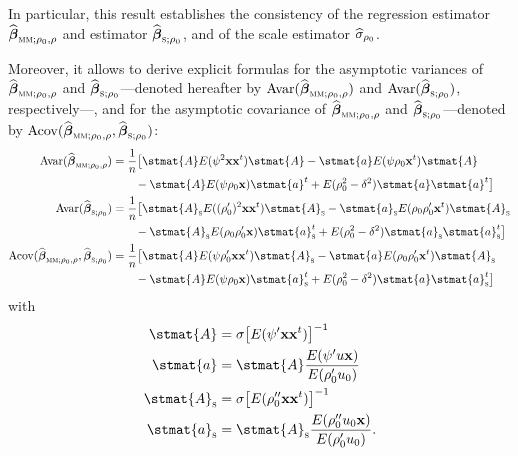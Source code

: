 In particular, this result establishes the consistency of the regression
 estimator $\sthat{\boldsymbol\beta}_{\stsc{MM};\rho_0,\rho}$ and
 estimator $\sthat{\boldsymbol\beta}_{\stsc{S};\rho_0}$, and of the
scale  estimator $\widehat{\sigma}_{\rho_0}$.

Moreover, it allows to derive explicit formulas for the asymptotic variances
of $\sthat{\boldsymbol\beta}_{\stsc{MM};\rho_0,\rho}$ and
$\sthat{\boldsymbol\beta}_{\stsc{S};\rho_0}$---denoted hereafter by
$\mathrm{Avar}(\sthat{\boldsymbol\beta}_{\stsc{MM};\rho_0,\rho})$ and 
$\mathrm{Avar}(\sthat{\boldsymbol\beta}_{\stsc{S};\rho_0})$, respectively---, and for the asymptotic
covariance of $\sthat{\boldsymbol\beta}_{\stsc{MM};\rho_0,\rho}$ and
$\sthat{\boldsymbol\beta}_{\stsc{S};\rho_0}$---denoted by
$\mathrm{Acov}(\sthat{\boldsymbol\beta}_{\stsc{MM};\rho_0,\rho},
\sthat{\boldsymbol\beta}_{\stsc{S};\rho_0})$:
%
\begin{align}
    \label{eq:Avar_betahat_MM}
    \mathrm{Avar}(\sthat{\boldsymbol\beta}_{\stsc{MM};\rho_0,\rho})
    & = \frac{1}{n} \big[ \stmat{A} E(\psi^2\stvec{x}\stvec{x}^t)\stmat{A} 
        - \stmat{a} E(\psi\rho_0\stvec{x}^t) \stmat{A}
    \\\nonumber & \qquad 
        - \stmat{A} E(\psi\rho_0\stvec{x}) \stmat{a}^t 
        + E(\rho_0^2 - \delta^2)  \stmat{a}\stmat{a}^t \big]
    \\
    \label{eq:Avar_betahat_S}
    \mathrm{Avar}(\sthat{\boldsymbol\beta}_{\stsc{S};\rho_0})
    & = \frac{1}{n} \big[ \stmat{A}_\stsc{S} E((\rho_0')^2 \stvec{x}\stvec{x}^t) \stmat{A}_\stsc{S} 
        - \stmat{a}_\stsc{S} E(\rho_0\rho_0'\stvec{x}^t) \stmat{A}_\stsc{S}
    \\\nonumber & \qquad 
        - \stmat{A}_\stsc{S} E(\rho_0\rho_0'\stvec{x}) \stmat{a}_\stsc{S}^t 
        + E(\rho_0^2 - \delta^2) \stmat{a}_\stsc{S}\stmat{a}_\stsc{S}^t \big]
    \\
    \label{eq:Acov_betahat_MM_S}
    \mathrm{Acov}(\sthat{\boldsymbol\beta}_{\stsc{MM};\rho_0,\rho},
        \sthat{\boldsymbol\beta}_{\stsc{S};\rho_0})
    & = \frac{1}{n} \big[ \stmat{A} E(\psi\rho_0'\stvec{x}\stvec{x}^t) \stmat{A}_\stsc{S}
        - \stmat{a} E(\rho_0\rho_0'\stvec{x}^t) \stmat{A}_\stsc{S}
    \\\nonumber & \qquad 
        - \stmat{A} E(\psi\rho_0\stvec{x}) \stmat{a}_\stsc{S}^t
        + E(\rho_0^2 - \delta^2) \stmat{a}\stmat{a}_\stsc{S}^t \big]
\end{align}
%
with
%
\begin{align}
    \label{eq:A}
    \stmat{A} &  = \sigma \left[ E(\psi'\stvec{x}\stvec{x}^t)\right]^{-1}
    \\
    \label{eq:a}
    \stmat{a} &  = \stmat{A} \frac{E(\psi'u\stvec{x})}{E(\rho_0'u_0)}
    \\
    \label{eq:A_S}
    \stmat{A}_\stsc{S} & = \sigma\left[E(\rho_0''\stvec{x}\stvec{x}^t)\right]^{-1}
    \\
    \label{eq:a_S}
    \stmat{a}_\stsc{S} & = \stmat{A}_\stsc{S}\frac{E(\rho_0''u_0\stvec{x})}{E(\rho_0'u_0)}.
\end{align}

